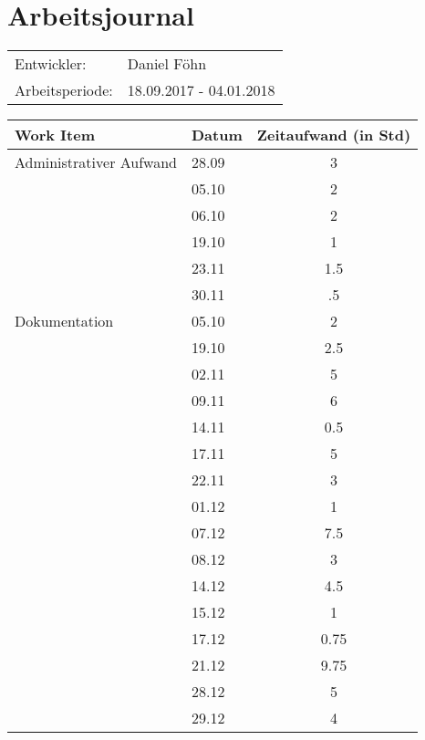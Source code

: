 \documentclass[a4paper, 10pt, fleqn]{article}
\newcommand{\header}{\textbf{Work Item}&\textbf{Datum}&\textbf{Zeitaufwand (in Std)}\\\toprule}
\begin{document}
	\section*{Arbeitsjournal}
    \begin{tabular}{ll}
        Entwickler: & Daniel Föhn \\
        Arbeitsperiode: & 18.09.2017 - 04.01.2018\\
    \end{tabular}
	\begin{longtable}{p{9cm}|p{2cm}|c}
        \header

        Administrativer Aufwand & 28.09 & 3\\
        & 05.10 & 2\\
        & 06.10 & 2\\
        & 19.10 & 1\\
        & 23.11 & 1.5\\
        & 30.11 & .5\\
        
        Dokumentation & 05.10 & 2\\
        & 19.10 & 2.5\\
        & 02.11 & 5\\
        & 09.11 & 6\\
        & 14.11 & 0.5\\
        & 17.11 & 5\\
        & 22.11 & 3\\
        & 01.12 & 1\\
        & 07.12 & 7.5\\
        & 08.12 & 3\\
        & 14.12 & 4.5\\
        & 15.12 & 1\\
        & 17.12 & 0.75\\
        & 21.12 & 9.75\\
        & 28.12 & 5\\
        & 29.12 & 4\\
        

\end{longtable}
\end{document}
